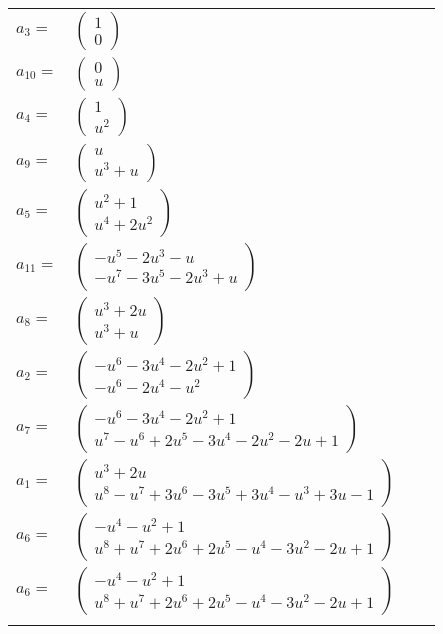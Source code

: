 \documentclass[1p]{elsarticle_modified}
\theoremstyle{definition}
\begin{document}
\begin{tabular}{m{7pt} m{180pt} m{7pt} m{180pt} }
\flushright $a_{3}=$&$\begin{pmatrix}1\\0\end{pmatrix}$ \\
\flushright $a_{10}=$&$\begin{pmatrix}0\\u\end{pmatrix}$ \\
\flushright $a_{4}=$&$\begin{pmatrix}1\\u^2\end{pmatrix}$ \\
\flushright $a_{9}=$&$\begin{pmatrix}u\\u^3+u\end{pmatrix}$ \\
\flushright $a_{5}=$&$\begin{pmatrix}u^2+1\\u^4+2 u^2\end{pmatrix}$ \\
\flushright $a_{11}=$&$\begin{pmatrix}- u^5-2 u^3- u\\- u^7-3 u^5-2 u^3+u\end{pmatrix}$ \\
\flushright $a_{8}=$&$\begin{pmatrix}u^3+2 u\\u^3+u\end{pmatrix}$ \\
\flushright $a_{2}=$&$\begin{pmatrix}- u^6-3 u^4-2 u^2+1\\- u^6-2 u^4- u^2\end{pmatrix}$ \\
\flushright $a_{7}=$&$\begin{pmatrix}- u^6-3 u^4-2 u^2+1\\u^7- u^6+2 u^5-3 u^4-2 u^2-2 u+1\end{pmatrix}$ \\
\flushright $a_{1}=$&$\begin{pmatrix}u^3+2 u\\u^8- u^7+3 u^6-3 u^5+3 u^4- u^3+3 u-1\end{pmatrix}$ \\
\flushright $a_{6}=$&$\begin{pmatrix}- u^4- u^2+1\\u^8+u^7+2 u^6+2 u^5- u^4-3 u^2-2 u+1\end{pmatrix}$\\ \flushright $a_{6}=$&$\begin{pmatrix}- u^4- u^2+1\\u^8+u^7+2 u^6+2 u^5- u^4-3 u^2-2 u+1\end{pmatrix}$\\&\end{tabular}
\end{document}
